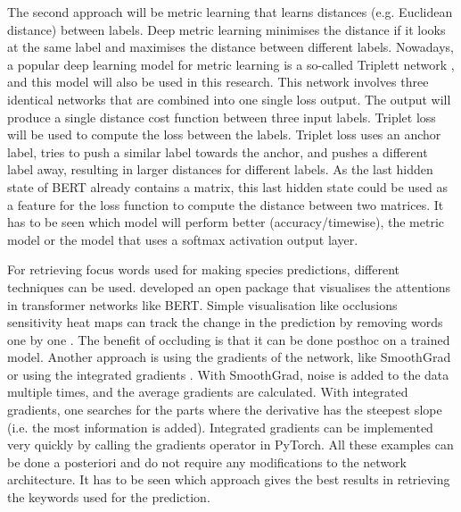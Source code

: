 \documentclass[a4paper, 12pt, oneside]{book} %
\begin{document}
The second approach will be metric learning that learns distances (e.g. Euclidean distance) between labels.
Deep metric learning minimises the distance if it looks at the same label and maximises the distance between different labels.
Nowadays, a popular deep learning model for metric learning is a so-called Triplett network \autocite{hoffer_deep_2015}, and this model will also be used in this research.
This network involves three identical networks that are combined into one single loss output.
The output will produce a single distance cost function between three input labels.
Triplet loss \autocite{schroff_facenet_2015} will be used to compute the loss between the labels.
Triplet loss uses an anchor label, tries to push a similar label towards the anchor, and pushes a different label away, resulting in larger distances for different labels.
As the last hidden state of BERT already contains a matrix, this last hidden state could be used as a feature for the loss function to compute the distance between two matrices.
It has to be seen which model will perform better (accuracy/timewise), the metric model or the model that uses a softmax activation output layer. 

For retrieving focus words used for making species predictions, different techniques can be used.
\textcite{vig_multiscale_2019} developed an open package that visualises the attentions in transformer networks like BERT.
Simple visualisation like occlusions sensitivity heat maps can track the change in the prediction by removing words one by one \autocite{fleet_visualizing_2014}.
The benefit of occluding is that it can be done posthoc on a trained model.
Another approach is using the gradients of the network, like SmoothGrad \autocite{smilkov_smoothgrad_2017} or using the integrated gradients \autocite{sundararajan_axiomatic_2017}.
With SmoothGrad, noise is added to the data multiple times, and the average gradients are calculated.
With integrated gradients, one searches for the parts where the derivative has the steepest slope (i.e. the most information is added).
Integrated gradients can be implemented very quickly by calling the gradients operator in PyTorch.
All these examples can be done a posteriori and do not require any modifications to the network architecture.
It has to be seen which approach gives the best results in retrieving the keywords used for the prediction.
\end{document}

